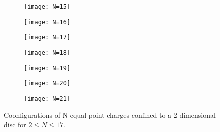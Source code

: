 \documentclass[12pt,a4paper,final]{iopart}
\begin{document}
{\begin{figure}
\begin{subfigure}[b]{0.24\textwidth}
  \end{subfigure}
  \begin{subfigure}[b]{0.24\textwidth}
    \texttt{[image: N=15]}
    \label{fig:2}
  \end{subfigure}
  \begin{subfigure}[b]{0.24\textwidth}
    \texttt{[image: N=16]}
    \label{fig:2}
  \end{subfigure}
  \begin{subfigure}[b]{0.24\textwidth}
    \texttt{[image: N=17]}
    \label{fig:2}
  \end{subfigure}
  \begin{subfigure}[b]{0.24\textwidth}
    \texttt{[image: N=18]}
    \label{fig:2}
  \end{subfigure}
  \begin{subfigure}[b]{0.24\textwidth}
    \texttt{[image: N=19]}
    \label{fig:2}
  \end{subfigure}
  \begin{subfigure}[b]{0.24\textwidth}
    \texttt{[image: N=20]}
    \label{fig:2}
  \end{subfigure}
  \begin{subfigure}[b]{0.24\textwidth}
    \texttt{[image: N=21]}
    \label{fig:2}
  \end{subfigure}
  \caption{Coonfigurations of N equal point charges confined to a 2-dimensional disc for $2 \leq N \leq 17$.}
\end{figure}

}
\end{document}
